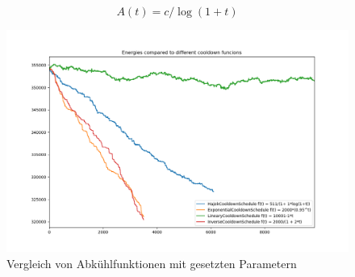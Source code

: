 \begin{equation}
    A(t) = c/\log(1+t)
\end{equation}

\begin{figure}[H]\label{pic:Cool Down Comparisson}
    \centering
    \includegraphics[width=\linewidth]{content/simulatedAnnealing/Bilder/Energy_Cooldown_compared_steps_9842.png}
    \caption{Vergleich von Abkühlfunktionen mit gesetzten Parametern}
\end{figure}

